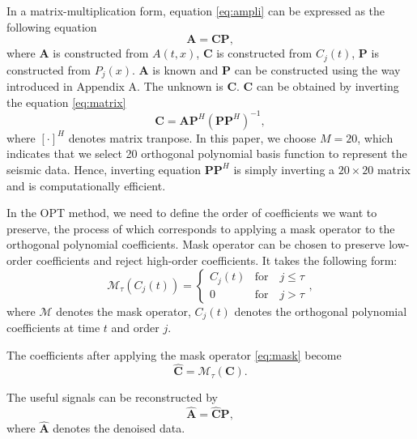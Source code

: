 In a matrix-multiplication form, equation \ref{eq:ampli} can be expressed as the following equation
\begin{equation}
\label{eq:matrix}
\mathbf{A} = \mathbf{C}\mathbf{P},
\end{equation}
where $\mathbf{A}$ is constructed from $A(t,x)$, $\mathbf{C}$ is constructed from $C_j(t)$, $\mathbf{P}$ is constructed from $P_j(x)$. $\mathbf{A}$ is known and $\mathbf{P}$ can be constructed using the way introduced in Appendix A. The unknown is $\mathbf{C}$.  $\mathbf{C}$ can be obtained by inverting the equation \ref{eq:matrix} 
\begin{equation}
\label{eq:inv}
 \mathbf{C}=\mathbf{A}\mathbf{P}^H(\mathbf{P}\mathbf{P}^H)^{-1},
\end{equation} 
where $[\cdot]^H$ denotes matrix tranpose.
In this paper, we choose $M=20$, which indicates that we select 20 orthogonal polynomial basis function to represent the seismic data. Hence, inverting equation $\mathbf{P}\mathbf{P}^H$ is simply inverting a $20\times 20$ matrix and is computationally efficient. 

In the OPT method, we need to define the order of coefficients we want to preserve, the process of which corresponds to applying a mask operator to the orthogonal polynomial coefficients. Mask operator can be chosen to preserve low-order coefficients and reject high-order coefficients. It takes the following form:
\begin{equation}
\label{eq:mask}
\mathcal{M}_{\tau}(C_j(t)) = \left\{ \begin{array}{ll}
C_j(t)  & \text{for}\quad  j \le \tau  \\
0	      & \text{for}\quad j > \tau
\end{array}\right.,
\end{equation}
where $\mathcal{M}$ denotes the mask operator, $C_j(t)$ denotes the orthogonal polynomial coefficients at time $t$ and order $j$. 

The coefficients after applying the mask operator \ref{eq:mask} become
\begin{equation}
\label{eq:inv}
 \hat{\mathbf{C}}=\mathcal{M}_{\tau}(\mathbf{C}).
\end{equation} 

The useful signals can be reconstructed by 
\begin{equation}
\label{eq:matrix1}
\hat{\mathbf{A}} = \hat{\mathbf{C}}\mathbf{P},
\end{equation}
where $\hat{\mathbf{A}}$ denotes the denoised data.

